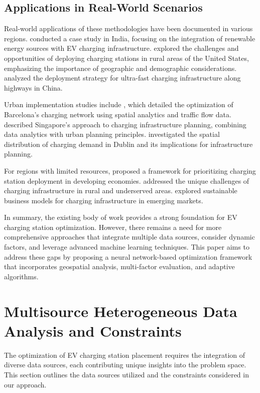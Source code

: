 \documentclass[journal]{IEEEtran}
\begin{document}
\subsection{Applications in Real-World Scenarios}
Real-world applications of these methodologies have been documented in various regions. \cite{rao2019india} conducted a case study in India, focusing on the integration of renewable energy sources with EV charging infrastructure. \cite{smith2020usa} explored the challenges and opportunities of deploying charging stations in rural areas of the United States, emphasizing the importance of geographic and demographic considerations. \cite{liu2022china} analyzed the deployment strategy for ultra-fast charging infrastructure along highways in China.

Urban implementation studies include \cite{casals2022barcelona}, which detailed the optimization of Barcelona's charging network using spatial analytics and traffic flow data. \cite{tang2021singapore} described Singapore's approach to charging infrastructure planning, combining data analytics with urban planning principles. \cite{morrissey2018spatial} investigated the spatial distribution of charging demand in Dublin and its implications for infrastructure planning.

For regions with limited resources, \cite{vazifeh2019optimizing} proposed a framework for prioritizing charging station deployment in developing economies. \cite{ghosh2020rural} addressed the unique challenges of charging infrastructure in rural and underserved areas. \cite{hassan2022sustainable} explored sustainable business models for charging infrastructure in emerging markets.

In summary, the existing body of work provides a strong foundation for EV charging station optimization. However, there remains a need for more comprehensive approaches that integrate multiple data sources, consider dynamic factors, and leverage advanced machine learning techniques. This paper aims to address these gaps by proposing a neural network-based optimization framework that incorporates geospatial analysis, multi-factor evaluation, and adaptive algorithms.

\section{Multisource Heterogeneous Data Analysis and Constraints}
The optimization of EV charging station placement requires the integration of diverse data sources, each contributing unique insights into the problem space. This section outlines the data sources utilized and the constraints considered in our approach.
\end{document}

